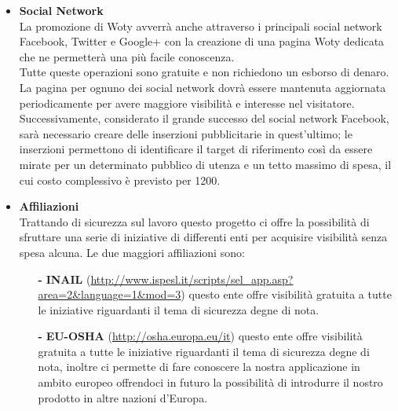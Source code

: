 \begin{itemize}
\item \textbf{Social Network}\\
La promozione di Woty avverrà anche attraverso i principali social network Facebook, Twitter e Google+ con la creazione di una pagina Woty dedicata che ne permetterà una più facile conoscenza.\\
Tutte queste operazioni sono gratuite e non richiedono un esborso di denaro.\\
La pagina per ognuno dei social network dovrà essere mantenuta aggiornata periodicamente per avere maggiore visibilità e interesse nel visitatore.\\
Successivamente, considerato il grande successo del social network Facebook, sarà necessario creare delle inserzioni pubblicitarie in quest'ultimo; le inserzioni permettono di identificare il target di riferimento così da essere mirate per un determinato pubblico di utenza e un tetto massimo di spesa, il cui costo complessivo è previsto per 1200\EUR.

\item \textbf{Affiliazioni}\\
Trattando di sicurezza sul lavoro questo progetto ci offre la possibilità di sfruttare una serie di iniziative di
differenti enti per acquisire visibilità senza spesa alcuna.
Le due maggiori affiliazioni sono:

\begin{itemize}
	\item[\textbf{-}] \textbf{INAIL} (\url{http://www.ispesl.it/scripts/sel_app.asp?area=2&language=1&mod=3}) questo ente offre visibilità gratuita a tutte le iniziative riguardanti il tema di sicurezza degne di nota.

	\item[\textbf{-}] \textbf{EU-OSHA} (\url{http://osha.europa.eu/it}) questo ente offre visibilità gratuita a tutte le iniziative riguardanti il tema di sicurezza degne di nota, inoltre ci permette di fare conoscere la nostra applicazione in ambito europeo offrendoci in futuro la possibilità di introdurre il nostro prodotto in altre nazioni d'Europa.

\end{itemize}


\end{itemize}
